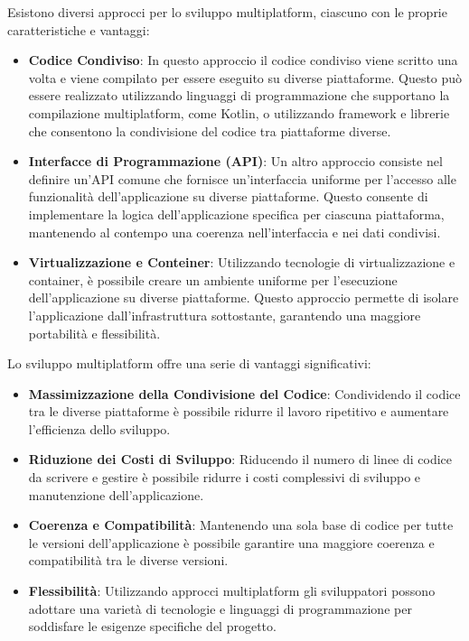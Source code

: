 \documentclass[12pt,a4paper,openright,twoside]{book}
\begin{document}
Esistono diversi approcci per lo sviluppo multiplatform, ciascuno con le proprie caratteristiche e vantaggi:
\begin{itemize}
\item \textbf{Codice Condiviso}: In questo approccio il codice condiviso viene scritto una volta e viene compilato per essere eseguito
 su diverse piattaforme. Questo può essere realizzato utilizzando linguaggi di programmazione che supportano la compilazione multiplatform, 
 come Kotlin, o utilizzando framework e librerie che consentono la condivisione del codice tra piattaforme diverse.
\item \textbf{Interfacce di Programmazione (API)}: Un altro approccio consiste nel definire un'API comune che fornisce un'interfaccia uniforme
 per l'accesso alle funzionalità dell'applicazione su diverse piattaforme. Questo consente di implementare la logica dell'applicazione specifica 
 per ciascuna piattaforma, mantenendo al contempo una coerenza nell'interfaccia e nei dati condivisi.
\item \textbf{Virtualizzazione e Conteiner}: Utilizzando tecnologie di virtualizzazione e container, è possibile creare un ambiente uniforme 
per l'esecuzione dell'applicazione su diverse piattaforme. Questo approccio permette di isolare l'applicazione dall'infrastruttura sottostante, 
garantendo una maggiore portabilità e flessibilità.
\end{itemize}

Lo sviluppo multiplatform offre una serie di vantaggi significativi:
\begin{itemize}
\item \textbf{Massimizzazione della Condivisione del Codice}: Condividendo il codice tra le diverse piattaforme 
è possibile ridurre il lavoro ripetitivo e aumentare l'efficienza dello sviluppo.
\item \textbf{Riduzione dei Costi di Sviluppo}: Riducendo il numero di linee di codice da scrivere e gestire 
è possibile ridurre i costi complessivi di sviluppo e manutenzione dell'applicazione.
\item \textbf{Coerenza e Compatibilità}: Mantenendo una sola base di codice per tutte le versioni dell'applicazione 
è possibile garantire una maggiore coerenza e compatibilità tra le diverse versioni.
\item \textbf{Flessibilità}: Utilizzando approcci multiplatform gli sviluppatori possono adottare una varietà di tecnologie e 
linguaggi di programmazione per soddisfare le esigenze specifiche del progetto.
\end{itemize}
\end{document}
